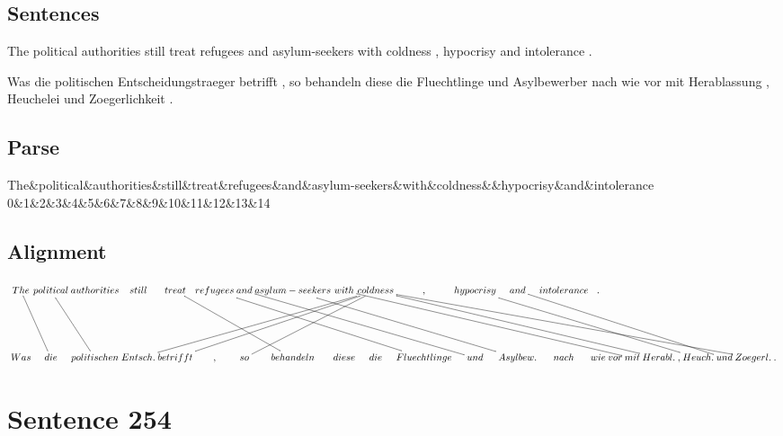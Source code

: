 \documentclass{report}
\begin{document}
\subsection*{Sentences}
The political authorities still treat refugees and asylum-seekers with coldness , hypocrisy and intolerance .

\noindent Was die politischen Entscheidungstraeger betrifft , so behandeln diese die Fluechtlinge und Asylbewerber nach wie vor mit Herablassung , Heuchelei und Zoegerlichkeit .



\subsection*{Parse}
\begin{dependency}[theme=simple]
\begin{deptext}[column sep=.5cm, row sep=.1ex]
The\&political\&authorities\&still\&treat\&refugees\&and\&asylum-seekers\&with\&coldness\&\&hypocrisy\&and\&intolerance\\
0\&1\&2\&3\&4\&5\&6\&7\&8\&9\&10\&11\&12\&13\&14\\
\end{deptext}
\end{dependency}


\subsection*{Alignment}
\scriptsize{
$
\xymatrix@C-2.3pc{
The \ar @{-} [ddr] & political \ar @{-} [ddr] & authorities & still & treat \ar @{-} [ddrrr] & refugees \ar @{-} [ddrrrrr] & and \ar @{-} [ddrrrrr] & asylum-seekers \ar @{-} [ddrrrrr] & with \ar @{-} [ddrrrrrrrr] & coldness \ar @{-} [ddrrrrrrrrrrrr] \ar @{-} [ddllllll] \ar @{-} [ddrrrrrrrr] \ar @{-} [ddlllll] \ar @{-} [ddlll] & , & hypocrisy \ar @{-} [ddrrrrrrrr] & and \ar @{-} [ddrrrrrrrr] & intolerance & .\\\\
Was & die & politischen & Entsch. & betrifft & , & so & behandeln & diese & die & Fluechtlinge & und & Asylbew. & nach & wie & vor & mit & Herabl. & , & Heuch. & und & Zoegerl. & .
}$}
\newpage\section*{Sentence 254}
\end{document}
